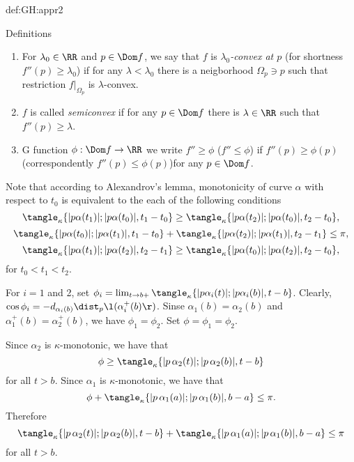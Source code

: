 {\begin{subthm}{def:GH:appr2}
\begin{thm}{Definitions}
\begin{enumerate}[(1)]
\item For $\lambda_0\in\RR$ and $p\in\Dom f$, we say that $f$ is \emph{$\lambda_0$-convex  at $p$} (for shortness $f''(p)\ge \lambda_0$)
if for any $\lambda<\lambda_0$ there is a neigborhood $\Omega_p\ni p$ such that restriction $f|_{\Omega_p}$ is $\lambda$-convex.

\item $f$ is called  \emph{semiconvex}%
%
%
%
if  for any $p\in\Dom f$ there is $\lambda\in\RR$ such that $f''(p)\ge \lambda$.

\item
G function $\phi:\Dom f\to\RR$ we write $f''\ge \phi$ ($f''\le \phi$) if $f''(p)\ge \phi(p)$ (correspondently $f''(p)\le \phi(p)$)for any $p\in\Dom f$. 
\end{enumerate}
\end{thm}













Note that according to Alexandrov's lemma,
monotonicity of curve $\alpha$ with respect to $t_0$ is equivalent to the each of the following conditions
$$\tangle_\kappa\{|p\alpha(t_1)|;|p\alpha(t_0)|,t_1-t_0\}
\ge
\tangle_\kappa\{|p\alpha(t_2)|;|p\alpha(t_0)|,t_2-t_0\},$$
$$\tangle_\kappa\{|p\alpha(t_0)|;|p\alpha(t_1)|,t_1-t_0\}
+
\tangle_\kappa\{|p\alpha(t_2)|;|p\alpha(t_1)|,t_2-t_1\}\le\pi,$$
$$\tangle_\kappa\{|p\alpha(t_1)|;|p\alpha(t_2)|,t_2-t_1\}
\ge
\tangle_\kappa\{|p\alpha(t_0)|;|p\alpha(t_2)|,t_2-t_0\},$$
for $t_0<t_1<t_2$.

For $i=1$ and 2, 
set $\phi_i=\lim_{t\to b+}\tangle_\kappa\{|p\alpha_i(t)|;|p\alpha_i(b)|,t-b\}$.
Clearly, $\cos\phi_i=-d_{\alpha_i(b)}\dist_p\l(\alpha_i^+(b)\r)$.
Sinse $\alpha_1(b)=\alpha_2(b)$ and $\alpha_1^+(b)=\alpha_2^+(b)$, we have $\phi_1=\phi_2$.
Set $\phi=\phi_1=\phi_2$.

Since $\alpha_2$ is $\kappa$-monotonic, we have that
$$\phi\ge\tangle_\kappa\{|p\,\alpha_2(t)|;|p\,\alpha_2(b)|,t-b\}$$ 
for all $t>b$.
Since $\alpha_1$ is $\kappa$-monotonic, we have that
$$\phi+\tangle_\kappa\{|p\,\alpha_1(a)|;|p\,\alpha_1(b)|,b-a\}\le\pi.$$
Therefore
$$\tangle_\kappa\{|p\,\alpha_2(t)|;|p\,\alpha_2(b)|,t-b\}+\tangle_\kappa\{|p\,\alpha_1(a)|;|p\,\alpha_1(b)|,b-a\}\le\pi$$
for all $t>b$.















\end{subthm}}
